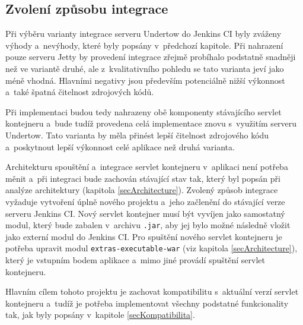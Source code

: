         \subsection{Zvolení způsobu integrace}
            Při výběru varianty integrace serveru Undertow do Jenkins CI byly zváženy
            výhody a~nevýhody, které byly popsány v~předchozí kapitole. Při nahrazení pouze serveru Jetty
            by provedení integrace zřejmě probíhalo podstatně snadněji než ve variantě druhé,
            ale z~kvalitativního pohledu se tato varianta jeví jako méně vhodná. 
            Hlavními 
            negativy jsou především potenciálně nižší výkonnost a~také špatná čitelnost
            zdrojových kódů.

            Při implementaci budou tedy nahrazeny obě komponenty stávajícího servlet kontejneru
            a~bude tudíž provedena celá implementace znovu s~využitím serveru Undertow. Tato
            varianta by měla přinést lepší čitelnost zdrojového kódu a~poskytnout 
            lepší výkonnost celé aplikace než druhá varianta.


            \medskip
            Architekturu spouštění a~integrace servlet kontejneru v~aplikaci není potřeba měnit a~při integraci bude
            zachován stávající stav tak, který byl popsán při analýze architektury (kapitola \ref{secArchitecture}).
            Zvolený způsob integrace vyžaduje vytvoření úplně nového projektu a~jeho začlenění do stávající
            verze serveru Jenkins CI. Nový servlet kontejner musí být vyvíjen jako samostatný modul,
            který bude zabalen v~archivu \texttt{.jar}, aby jej bylo možné následně vložit jako externí modul do Jenkins CI.
            Pro spuštění nového servlet kontejneru
            je potřeba upravit modul \texttt{extras-executable-war} (viz kapitola \ref{secArchitecture}), který
            je vstupním bodem aplikace a~mimo jiné provádí spuštění servlet kontejneru.
            
            Hlavním cílem tohoto projektu je zachovat kompatibilitu s~aktuální verzí servlet kontejneru a~tudíž je 
            potřeba implementovat všechny podstatné funkcionality tak, jak byly popsány v~kapitole \ref{secKompatibilita}.
            













